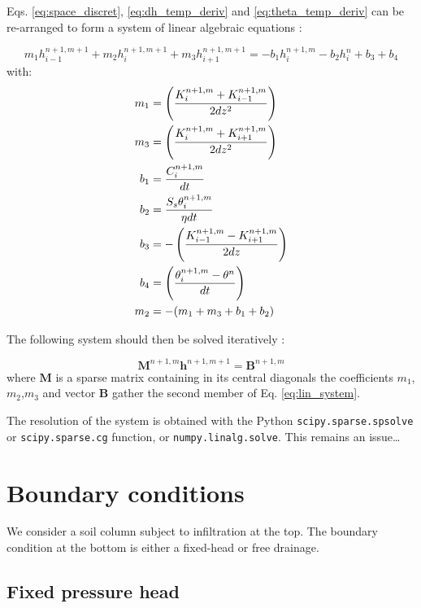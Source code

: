 \documentclass[a4paper,12pt]{article}
\begin{document}
Eqs. \ref{eq:space_discret}, \ref{eq:dh_temp_deriv} and \ref{eq:theta_temp_deriv} can be re-arranged to form a system of linear algebraic equations :

\begin{equation} \label{eq:lin_system}
    m_1 h_{i-1}^{n+1,m+1} + m_2 h_i^{n+1,m+1} + m_3 h_{i+1}^{n+1,m+1} = - b_1 h_i^{n+1,m} - b_2 h_i^n + b_3 + b_4
\end{equation}
with:
\begin{align} \label{eq:coefficients}
    m_1 & = \left(\frac{K_i^{n+1,m}+K_{i-1}^{n+1,m}}{2dz^2}\right)  \\
    m_3 & = \left(\frac{K_i^{n+1,m}+K_{i+1}^{n+1,m}}{2dz^2}\right)  \\
    b_1 & = \frac{C_i^{n+1,m}}{dt} \\
    b_2 & = \frac{S_s\theta_i^{n+1,m}}{\eta dt} \\
    b_3 & = - \left(\frac{K_{i-1}^{n+1,m}-K_{i+1}^{n+1,m}}{2dz}\right) \\
    b_4 & = \left( { \theta_i^{n+1,m} - \theta^n \over dt} \right) \\
    m_2 & = - ( m_1 + m_3 + b_1 + b_2)
\end{align}

The following system should then be solved iteratively : 

\begin{equation} \label{eq:mat_system}
    \mathbf{M}^{n+1,m} \mathbf{h}^{n+1,m+1} = \mathbf{B}^{n+1,m}
\end{equation}
where $\mathbf{M}$ is a sparse matrix containing in its central diagonals the coefficients $m_1$,$m_2$,$m_3$ and vector $\mathbf{B}$ gather the second member of Eq. \ref{eq:lin_system}. 

The resolution of the system is obtained with the Python \texttt{scipy.sparse.spsolve} or \texttt{scipy.sparse.cg}  function, or \texttt{numpy.linalg.solve}.
This remains an issue\dots

\section{Boundary conditions}

We consider a soil column subject to infiltration at the top. The boundary condition at the bottom is either a fixed-head or free drainage.

\subsection{Fixed pressure head}
\end{document}
